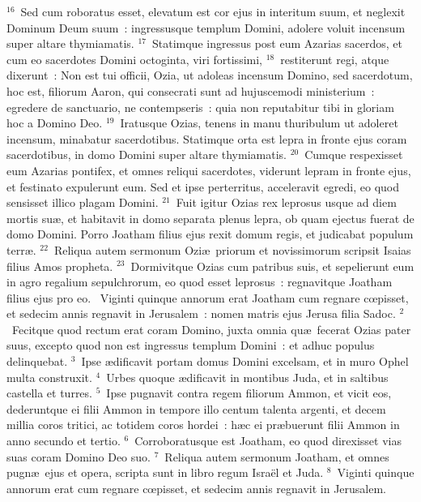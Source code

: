 ${}^{16}$~Sed cum roboratus esset, elevatum est cor ejus in interitum suum, et neglexit Dominum Deum suum~: ingressusque templum Domini, adolere voluit incensum super altare thymiamatis.
${}^{17}$~Statimque ingressus post eum Azarias sacerdos, et cum eo sacerdotes Domini octoginta, viri fortissimi,
${}^{18}$~restiterunt regi, atque dixerunt~: Non est tui officii, Ozia, ut adoleas incensum Domino, sed sacerdotum, hoc est, filiorum Aaron, qui consecrati sunt ad hujuscemodi ministerium~: egredere de sanctuario, ne contempseris~: quia non reputabitur tibi in gloriam hoc a Domino Deo.
${}^{19}$~Iratusque Ozias, tenens in manu thuribulum ut adoleret incensum, minabatur sacerdotibus. Statimque orta est lepra in fronte ejus coram sacerdotibus, in domo Domini super altare thymiamatis.
${}^{20}$~Cumque respexisset eum Azarias pontifex, et omnes reliqui sacerdotes, viderunt lepram in fronte ejus, et festinato expulerunt eum. Sed et ipse perterritus, acceleravit egredi, eo quod sensisset illico plagam Domini.
${}^{21}$~Fuit igitur Ozias rex leprosus usque ad diem mortis su\ae , et habitavit in domo separata plenus lepra, ob quam ejectus fuerat de domo Domini. Porro Joatham filius ejus rexit domum regis, et judicabat populum terr\ae .
${}^{22}$~Reliqua autem sermonum Ozi\ae\ priorum et novissimorum scripsit Isaias filius Amos propheta.
${}^{23}$~Dormivitque Ozias cum patribus suis, et sepelierunt eum in agro regalium sepulchrorum, eo quod esset leprosus~: regnavitque Joatham filius ejus pro eo.
~Viginti quinque annorum erat Joatham cum regnare cœpisset, et sedecim annis regnavit in Jerusalem~: nomen matris ejus Jerusa filia Sadoc.
${}^{2}$~Fecitque quod rectum erat coram Domino, juxta omnia qu\ae\ fecerat Ozias pater suus, excepto quod non est ingressus templum Domini~: et adhuc populus delinquebat.
${}^{3}$~Ipse \ae dificavit portam domus Domini excelsam, et in muro Ophel multa construxit.
${}^{4}$~Urbes quoque \ae dificavit in montibus Juda, et in saltibus castella et turres.
${}^{5}$~Ipse pugnavit contra regem filiorum Ammon, et vicit eos, dederuntque ei filii Ammon in tempore illo centum talenta argenti, et decem millia coros tritici, ac totidem coros hordei~: h\ae c ei pr\ae buerunt filii Ammon in anno secundo et tertio.
${}^{6}$~Corroboratusque est Joatham, eo quod direxisset vias suas coram Domino Deo suo.
${}^{7}$~Reliqua autem sermonum Joatham, et omnes pugn\ae\ ejus et opera, scripta sunt in libro regum Isra\"el et Juda.
${}^{8}$~Viginti quinque annorum erat cum regnare cœpisset, et sedecim annis regnavit in Jerusalem.
